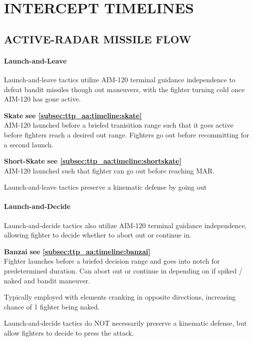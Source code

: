 \section{INTERCEPT TIMELINES}
\label{sec:ttp_aa:timelines}

\subsection[AR FLOW]{ACTIVE-RADAR MISSILE FLOW}

\paragraph{Launch-and-Leave}
Launch-and-leave tactics utilize AIM-120 terminal guidance independence 
to defeat bandit missiles though out maneuvers, 
with the fighter turning cold once AIM-120 has gone active.

\bigskip
\textbf{Skate} \hfill \textbf{see \cref{subsec:ttp_aa:timeline:skate}}\\
AIM-120 launched before a briefed tranisition range 
such that it goes active before fighters reach a desired out range.
Fighters go out before recommitting for a second launch.

\bigskip
\textbf{Short-Skate} \hfill \textbf{see \cref{subsec:ttp_aa:timeline:shortskate}}\\
AIM-120 launched such that fighter can go out before reaching MAR.

\bigskip
Launch-and-leave tactics preserve a kinematic defense by going out

\paragraph{Launch-and-Decide}
Launch-and-decide tactics also utilize AIM-120 terminal guidance independence, 
allowing fighter to decide whether to abort out or continue in.

\bigskip
\textbf{Banzai} \hfill \textbf{see \cref{subsec:ttp_aa:timeline:banzai}}\\
Fighter launches before a briefed decision range and goes into notch for predetermined duration. 
Can abort out or continue in depending on if spiked / naked and bandit maneuver.

Typically employed with elements cranking in opposite directions, 
increasing chance of 1 fighter being naked.

\bigskip
Launch-and-decide tactics do NOT necessarily preserve a kinematic defense, 
but allow fighters to decide to press the attack.

